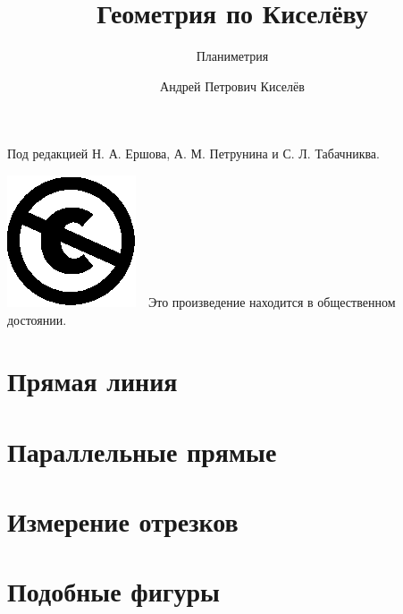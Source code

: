 \documentclass[twoside]{book}
\begin{document}
\cleardoublepage
\frontmatter
\title{Геометрия по Киселёву}
\subtitle{Планиметрия}
\author{Андрей Петрович Киселёв
}
\date{}
\maketitle

\thispagestyle{empty}

Под редакцией Н. А. Ершова, А. М. Петрунина и С. Л. Табачниква.

\vfill
\noindent
\includegraphics[scale=.25]{eps/Cc-public_domain_mark_white}\ \ 
Это произведение находится в общественном достоянии.

\mainmatter





\chapter{Прямая линия}





\chapter{Параллельные прямые}










\chapter{Измерение отрезков}



\chapter{Подобные фигуры}







\end{document}
